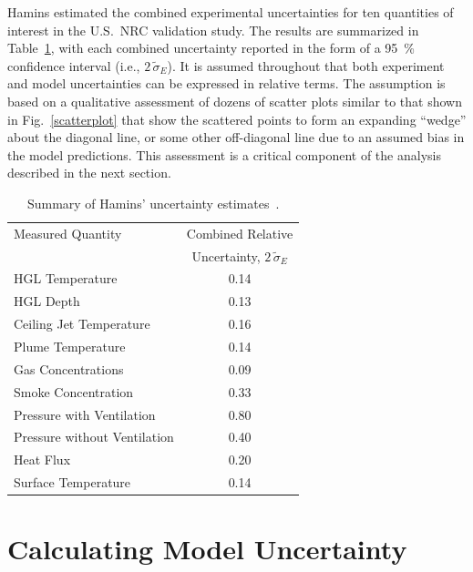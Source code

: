 Hamins estimated the combined experimental uncertainties for ten quantities of interest in the U.S.~NRC validation study.
The results are summarized in Table~\ref{Uncertainty}, with
each combined uncertainty reported in the form of a 95~\% confidence interval (i.e., $2 \, \widetilde{\sigma}_E$).
It is assumed throughout that both experiment and model uncertainties can be expressed in relative terms.
The assumption is based on a
qualitative assessment of dozens of scatter plots similar to that shown in Fig.~\ref{scatterplot} that show
the scattered points to form an expanding ``wedge''
about the diagonal line, or some other off-diagonal line due to an assumed bias in the model predictions.
This assessment is a critical component of the
analysis described in the next section.
\begin{table}[ht]
\caption{Summary of Hamins' uncertainty estimates~\cite{NUREG_1824}. }
\begin{center}
\begin{tabular}{|l|c|}
\hline
Measured Quantity               & Combined Relative       \\
                                & Uncertainty, $2 \, \widetilde{\sigma}_E$       \\ \hline \hline
HGL Temperature                 & 0.14    \\ \hline
HGL Depth                       & 0.13    \\ \hline
Ceiling Jet Temperature         & 0.16    \\ \hline
Plume Temperature               & 0.14    \\ \hline
Gas Concentrations              & 0.09    \\ \hline
Smoke Concentration             & 0.33    \\ \hline
Pressure with Ventilation       & 0.80    \\ \hline
Pressure without Ventilation    & 0.40    \\ \hline
Heat Flux                       & 0.20    \\ \hline
Surface Temperature             & 0.14    \\ \hline
\end{tabular}
\end{center}
\label{Uncertainty}
\end{table}



\section{Calculating Model Uncertainty}

